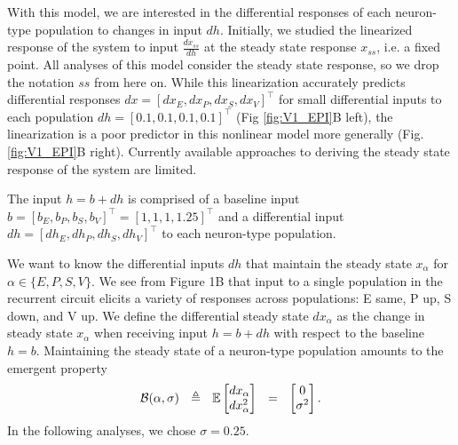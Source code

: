\documentclass[11pt]{article}
\begin{document}



 With this model, we are interested in the differential responses of each neuron-type population to changes in input $dh$. 
 Initially, we studied the linearized response of the system to input $\frac{dx_{ss}}{dh}$ at the steady state response $x_{ss}$, i.e. a fixed point. 
 All analyses of this model consider the steady state response, so we drop the notation $ss$ from here on.
 While this linearization accurately predicts differential responses $dx = \left[ dx_{E} , dx_{P} , dx_{S} ,dx_{V} \right]^\top$  for small differential inputs to each population $dh = \left[ 0.1 , 0.1 , 0.1 , 0.1 \right]^\top$ (Fig \ref{fig:V1_EPI}B left), the linearization is a poor predictor in this nonlinear model more generally (Fig. \ref{fig:V1_EPI}B right).  
 Currently available approaches to deriving the steady state response of the system are limited.

The input $h = b + dh$ is comprised of a baseline input  $b = \left[ b_E, b_P , b_S , b_V \right]^\top = \left[ 1, 1, 1 ,1.25 \right]^\top$  and a differential input $dh = \left[ dh_E , dh_P , dh_S , dh_V\right]^\top$ to each neuron-type population.  

We want to know the differential inputs $dh$ that maintain the steady state $x_{\alpha}$ for $\alpha \in \{E, P, S, V\}$. 
We see from Figure 1B that input to a single population in the recurrent circuit elicits a variety of responses across populations: E same, P up, S down, and V up.
We define the differential steady state $dx_{\alpha}$ as the change in steady state $x_{\alpha}$ when receiving input $h=b + dh$ with respect to the baseline $h = b$.
Maintaining the steady state of a neuron-type population amounts to the emergent property 
\begin{equation}
\mathcal{B}(\alpha, \sigma) ~~\triangleq~~ 
\mathbb{E} \begin{bmatrix} dx_{\alpha} \\ dx_{\alpha}^2 \end{bmatrix} ~~=~~ \begin{bmatrix} 0 \\ \sigma^2 \end{bmatrix}.\\
\end{equation}
In the following analyses, we chose $\sigma=0.25$.
\end{document}
